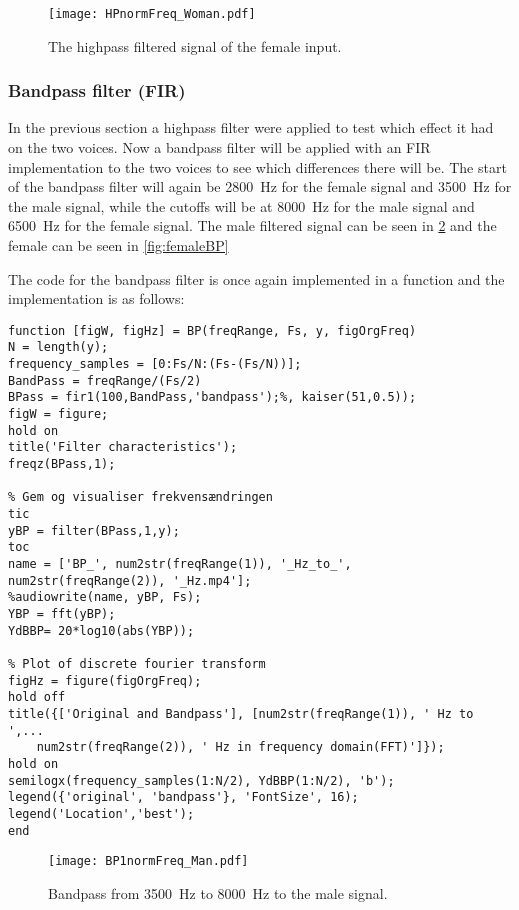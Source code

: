 \begin{figure}[h]
	\centering
	\texttt{[image: HPnormFreq\_Woman.pdf]}
	\caption{The highpass filtered signal of the female input.}
	\label{fig:HPFemale}
\end{figure}

\subsubsection{Bandpass filter (FIR)}
\label{sec:Bandpass}
In the previous section a highpass filter were applied to test which effect it had on the two voices. Now a bandpass filter will be applied with an FIR implementation to the two voices to see which differences there will be. The start of the bandpass filter will again be \SI{2800}{\hertz} for the female signal and \SI{3500}{\hertz} for the male signal, while the cutoffs will be at \SI{8000}{\hertz} for the male signal and \SI{6500}{\hertz} for the female signal. The male filtered signal can be seen in \cref{fig:maleBP} and the female can be seen in \cref{fig:femaleBP}

The code for the bandpass filter is once again implemented in a function and the implementation is as follows:

\begin{verbatim}
function [figW, figHz] = BP(freqRange, Fs, y, figOrgFreq)
N = length(y);
frequency_samples = [0:Fs/N:(Fs-(Fs/N))];
BandPass = freqRange/(Fs/2)
BPass = fir1(100,BandPass,'bandpass');%, kaiser(51,0.5));
figW = figure;
hold on
title('Filter characteristics');
freqz(BPass,1);

% Gem og visualiser frekvensændringen
tic
yBP = filter(BPass,1,y);
toc
name = ['BP_', num2str(freqRange(1)), '_Hz_to_', num2str(freqRange(2)), '_Hz.mp4'];
%audiowrite(name, yBP, Fs);
YBP = fft(yBP);
YdBBP= 20*log10(abs(YBP));

% Plot of discrete fourier transform
figHz = figure(figOrgFreq);
hold off
title({['Original and Bandpass'], [num2str(freqRange(1)), ' Hz to ',...
	num2str(freqRange(2)), ' Hz in frequency domain(FFT)']});
hold on
semilogx(frequency_samples(1:N/2), YdBBP(1:N/2), 'b');
legend({'original', 'bandpass'}, 'FontSize', 16);
legend('Location','best');
end
\end{verbatim}

\begin{figure}[h]
	\centering
	\texttt{[image: BP1normFreq\_Man.pdf]}
	\caption{Bandpass from \SI{3500}{\hertz} to \SI{8000}{\hertz} to the male signal.}
	\label{fig:maleBP}
\end{figure}

